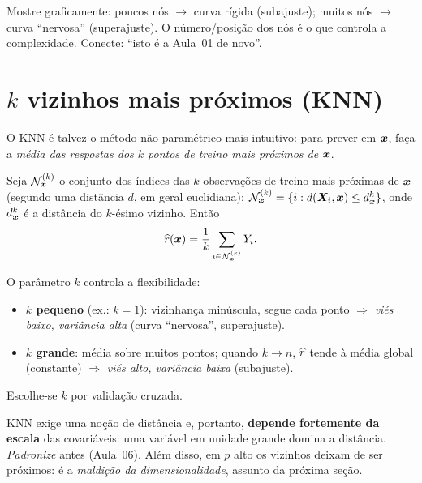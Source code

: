 \documentclass[11pt,a4paper]{article}
\begin{document}
\begin{emsala}
Mostre graficamente: poucos nós $\to$ curva rígida (subajuste); muitos nós $\to$
curva ``nervosa'' (superajuste). O número/posição dos nós é o que controla a
complexidade. Conecte: ``isto é a Aula~01 de novo''.
\end{emsala}

\section{$k$ vizinhos mais próximos (KNN)}
O KNN é talvez o método não paramétrico mais intuitivo: para prever em $\bm{x}$, faça
a \emph{média das respostas dos $k$ pontos de treino mais próximos de $\bm{x}$}.

\begin{definicao}
Seja $\mathcal{N}_{\bm{x}}^{(k)}$ o conjunto dos índices das $k$ observações de treino mais
próximas de $\bm{x}$ (segundo uma distância $d$, em geral euclidiana):
$\mathcal{N}_{\bm{x}}^{(k)}=\{i : d(\bm{X}_i,\bm{x})\le d^{k}_{\bm{x}}\}$, onde $d^k_{\bm{x}}$ é a distância
do $k$-ésimo vizinho. Então
\begin{equation}\label{eq:knn}
  \widehat{r}(\bm{x}) = \frac{1}{k}\sum_{i\in\mathcal{N}_{\bm{x}}^{(k)}} Y_i .
\end{equation}
\end{definicao}

O parâmetro $k$ controla a flexibilidade:
\begin{itemize}[leftmargin=1.4cm]
  \item \textbf{$k$ pequeno} (ex.: $k=1$): vizinhança minúscula, segue cada ponto
        $\Rightarrow$ \emph{viés baixo, variância alta} (curva ``nervosa'',
        superajuste).
  \item \textbf{$k$ grande}: média sobre muitos pontos; quando $k\to n$, $\widehat{r}$
        tende à média global (constante) $\Rightarrow$ \emph{viés alto, variância
        baixa} (subajuste).
\end{itemize}
Escolhe-se $k$ por validação cruzada.

\begin{atencao}
KNN exige uma noção de distância e, portanto, \textbf{depende fortemente da escala}
das covariáveis: uma variável em unidade grande domina a distância. \emph{Padronize}
antes (Aula~06). Além disso, em $p$ alto os vizinhos deixam de ser próximos: é a
\emph{maldição da dimensionalidade}, assunto da próxima seção.
\end{atencao}
\end{document}
